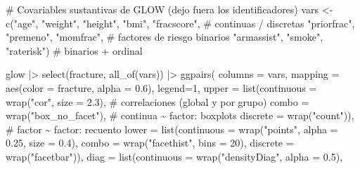 \documentclass[
  letterpaper,
  DIV=11,
  numbers=noendperiod]{scrartcl}
\newenvironment{Shaded}{\begin{snugshade}}{\end{snugshade}}
\newcommand{\AttributeTok}[1]{\textcolor[rgb]{0.40,0.45,0.13}{#1}}
\newcommand{\CommentTok}[1]{\textcolor[rgb]{0.37,0.37,0.37}{#1}}
\newcommand{\DecValTok}[1]{\textcolor[rgb]{0.68,0.00,0.00}{#1}}
\newcommand{\FloatTok}[1]{\textcolor[rgb]{0.68,0.00,0.00}{#1}}
\newcommand{\FunctionTok}[1]{\textcolor[rgb]{0.28,0.35,0.67}{#1}}
\newcommand{\NormalTok}[1]{\textcolor[rgb]{0.00,0.23,0.31}{#1}}
\newcommand{\OtherTok}[1]{\textcolor[rgb]{0.00,0.23,0.31}{#1}}
\newcommand{\SpecialCharTok}[1]{\textcolor[rgb]{0.37,0.37,0.37}{#1}}
\newcommand{\StringTok}[1]{\textcolor[rgb]{0.13,0.47,0.30}{#1}}
\begin{document}
\begin{Shaded}
\begin{Highlighting}[]
\CommentTok{\# Covariables sustantivas de GLOW (dejo fuera los identificadores)}
\NormalTok{vars }\OtherTok{\textless{}{-}} \FunctionTok{c}\NormalTok{(}\StringTok{"age"}\NormalTok{, }\StringTok{"weight"}\NormalTok{, }\StringTok{"height"}\NormalTok{, }\StringTok{"bmi"}\NormalTok{, }\StringTok{"fracscore"}\NormalTok{,   }\CommentTok{\# continuas / discretas}
          \StringTok{"priorfrac"}\NormalTok{, }\StringTok{"premeno"}\NormalTok{, }\StringTok{"momfrac"}\NormalTok{,               }\CommentTok{\# factores de riesgo binarios}
          \StringTok{"armassist"}\NormalTok{, }\StringTok{"smoke"}\NormalTok{, }\StringTok{"raterisk"}\NormalTok{)                }\CommentTok{\# binarios + ordinal}

\NormalTok{glow }\SpecialCharTok{|\textgreater{}}
  \FunctionTok{select}\NormalTok{(fracture, }\FunctionTok{all\_of}\NormalTok{(vars)) }\SpecialCharTok{|\textgreater{}}
  \FunctionTok{ggpairs}\NormalTok{(}
    \AttributeTok{columns =}\NormalTok{ vars,}
    \AttributeTok{mapping =} \FunctionTok{aes}\NormalTok{(}\AttributeTok{color =}\NormalTok{ fracture, }\AttributeTok{alpha =} \FloatTok{0.6}\NormalTok{),}
    \AttributeTok{legend=}\DecValTok{1}\NormalTok{,}
    \AttributeTok{upper =} \FunctionTok{list}\NormalTok{(}\AttributeTok{continuous =} \FunctionTok{wrap}\NormalTok{(}\StringTok{"cor"}\NormalTok{, }\AttributeTok{size =} \FloatTok{2.3}\NormalTok{),     }\CommentTok{\# correlaciones (global y por grupo)}
                 \AttributeTok{combo      =} \FunctionTok{wrap}\NormalTok{(}\StringTok{"box\_no\_facet"}\NormalTok{),         }\CommentTok{\# continua \textasciitilde{} factor: boxplots}
                 \AttributeTok{discrete   =} \FunctionTok{wrap}\NormalTok{(}\StringTok{"count"}\NormalTok{)),               }\CommentTok{\# factor \textasciitilde{} factor: recuento}
    \AttributeTok{lower =} \FunctionTok{list}\NormalTok{(}\AttributeTok{continuous =} \FunctionTok{wrap}\NormalTok{(}\StringTok{"points"}\NormalTok{, }\AttributeTok{alpha =} \FloatTok{0.25}\NormalTok{, }\AttributeTok{size =} \FloatTok{0.4}\NormalTok{),}
                 \AttributeTok{combo      =} \FunctionTok{wrap}\NormalTok{(}\StringTok{"facethist"}\NormalTok{, }\AttributeTok{bins =} \DecValTok{20}\NormalTok{),}
                 \AttributeTok{discrete   =} \FunctionTok{wrap}\NormalTok{(}\StringTok{"facetbar"}\NormalTok{)),}
    \AttributeTok{diag  =} \FunctionTok{list}\NormalTok{(}\AttributeTok{continuous =} \FunctionTok{wrap}\NormalTok{(}\StringTok{"densityDiag"}\NormalTok{, }\AttributeTok{alpha =} \FloatTok{0.5}\NormalTok{),}

\end{Highlighting}
\end{Shaded}
\end{document}
